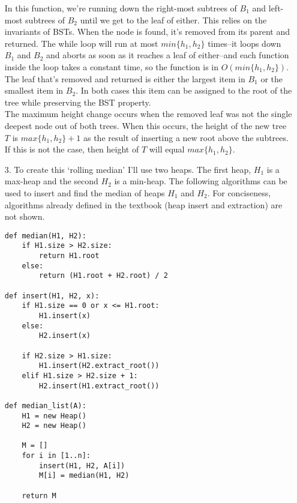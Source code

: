 \documentclass{article}
\begin{document}
\begin{enumerate}
    In this function, we're running down the right-most subtrees of $B_1$ and left-most subtrees of $B_2$ until we get to the leaf of either. This relies on the invariants of BSTs. When the node is found, it's removed from its parent and returned. The while loop will run at most $min\{h_1, h_2\}$ times--it loops down $B_1$ and $B_2$ and aborts as soon as it reaches a leaf of either--and each function inside the loop takes a constant time, so the function is in $O(min\{h_1, h_2\})$. \\

    The leaf that's removed and returned is either the largest item in $B_1$ or the smallest item in $B_2$. In both cases this item can be assigned to the root of the tree while preserving the BST property. \\

    The maximum height change occurs when the removed leaf was not the single deepest node out of both trees. When this occurs, the height of the new tree $T$ is $max\{h_1, h_2\} + 1$ as the result of inserting a new root above the subtrees. If this is not the case, then height of $T$ will equal $max\{h_1, h_2\}$.

\item [3.] To create this `rolling median' I'll use two heaps. The first heap, $H_1$ is a max-heap and the second $H_2$ is a min-heap. The following algorithms can be used to insert and find the median of heaps $H_1$ and $H_2$. For conciseness, algorithms already defined in the textbook (heap insert and extraction) are not shown.
\begin{lstlisting}
def median(H1, H2):
    if H1.size > H2.size:
        return H1.root
    else:
        return (H1.root + H2.root) / 2

def insert(H1, H2, x):
    if H1.size == 0 or x <= H1.root:
        H1.insert(x)
    else:
        H2.insert(x)

    if H2.size > H1.size:
        H1.insert(H2.extract_root())
    elif H1.size > H2.size + 1:
        H2.insert(H1.extract_root())

def median_list(A):
    H1 = new Heap()
    H2 = new Heap()

    M = []
    for i in [1..n]:
        insert(H1, H2, A[i])
        M[i] = median(H1, H2)

    return M


\end{lstlisting}
\end{enumerate}
\end{document}
